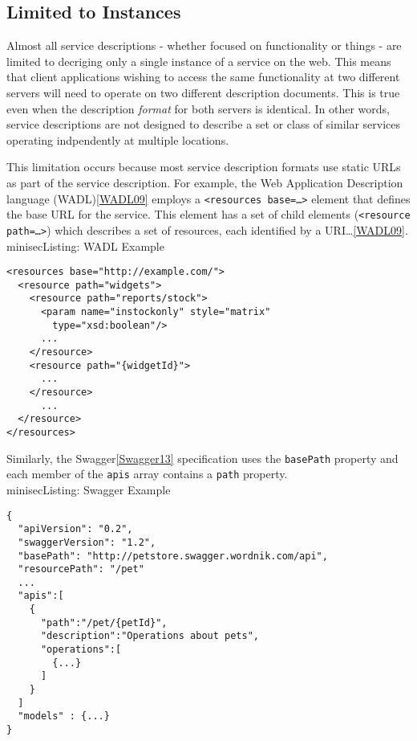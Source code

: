 \documentclass{wsrest2014}
\begin{document}
\subsection{Limited to Instances}
\label{_limited_to_instances}
 \par{}Almost all service descriptions - whether focused on functionality or things - are limited to decriging only a single instance of a service on the web. This means that client applications wishing to access the same functionality at two different servers will need to operate on two different description documents. This is true even when the description \emph{format} for both servers is identical. In other words, service descriptions are not designed to describe a set or class of similar services operating indpendently at multiple locations.
 \par{}This limitation occurs because most service description formats use static URLs as part of the service description. For example, the Web Application Description language (WADL)\hyperlink{WADL09}{[WADL09]} employs a \texttt{\textless{}resources base=\textquotedbl{}\dots{}\textquotedbl{}\textgreater{}} element that defines the base URL for the service. This element has a set of child elements (\texttt{\textless{}resource path=\textquotedbl{}\dots{}\textquotedbl{}\textgreater{}}) which \textquotedbl{}describes a set of resources, each identified by a URI\dots{}\textquotedbl{}\hyperlink{WADL09}{[WADL09]}.
\\minisec{Listing: WADL Example}
\begin{verbatim}<resources base="http://example.com/">
  <resource path="widgets">
    <resource path="reports/stock">
      <param name="instockonly" style="matrix"
        type="xsd:boolean"/>
      ...
    </resource>
    <resource path="{widgetId}">
      ...
    </resource>
      ...
  </resource>
</resources>\end{verbatim}

 \par{}Similarly, the Swagger\hyperlink{Swagger13}{[Swagger13]} specification uses the \texttt{basePath} property and each member of the \texttt{apis} array contains a \texttt{path} property.
\\minisec{Listing: Swagger Example}
\begin{verbatim}{
  "apiVersion": "0.2",
  "swaggerVersion": "1.2",
  "basePath": "http://petstore.swagger.wordnik.com/api",
  "resourcePath": "/pet"
  ...
  "apis":[
    {
      "path":"/pet/{petId}",
      "description":"Operations about pets",
      "operations":[
        {...}
      ]
    }
  ]
  "models" : {...}
}\end{verbatim}
\end{document}
